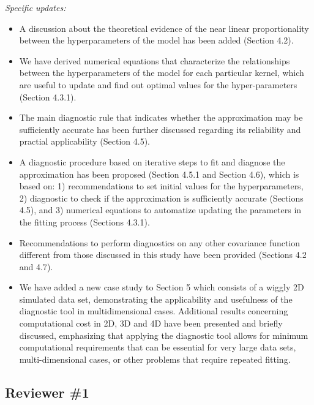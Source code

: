 \documentclass[11pt]{report}
\begin{document}
\noindent \textit{Specific updates:}

\begin{itemize}

\item A discussion about the theoretical evidence of the near linear proportionality between the hyperparameters of the model has been added (Section 4.2). 

\item We have derived numerical equations that characterize the relationships between the hyperparameters of the model for each particular kernel, which are useful to update and find out optimal values for the hyper-parameters (Section 4.3.1). 

\item The main diagnostic rule that indicates whether the approximation may be sufficiently accurate has been further discussed regarding its reliability and practial applicability (Section 4.5).

\item A diagnostic procedure based on iterative steps to fit and diagnose the approximation has been proposed (Section 4.5.1 and Section 4.6), which is based on: 1) recommendations to set initial values for the hyperparameters, 2) diagnostic to check if the approximation is sufficiently accurate (Sections 4.5), and 3) numerical equations to automatize updating the parameters in the fitting process (Sections 4.3.1).

\item Recommendations to perform diagnostics on any other covariance function different from those discussed in this study have been provided (Sections 4.2 and 4.7).

\item We have added a new case study to Section 5 which consists of a wiggly 2D simulated data set, demonstrating the applicability and usefulness of the diagnostic tool in multidimensional cases. Additional results concerning computational cost in 2D, 3D and 4D have been presented and briefly discussed, emphasizing that applying the diagnostic tool allows for minimum computational requirements that can be essential for very large data sets, multi-dimensional cases, or other problems that require repeated fitting.

\end{itemize}

\noindent \hdashrule{12.5cm}{0.2pt}{2mm 1pt}

\subsection*{Reviewer \#1}
\end{document}
